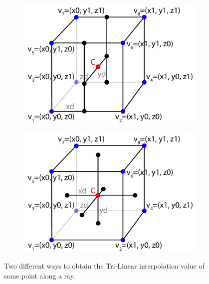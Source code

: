 \begin{figure}[h!]
    \centering
    \captionsetup{justification=centering,margin=0.5cm}
    \begin{subfigure}[t]{0.48\textwidth}
        \includegraphics[width=\textwidth]{img/tri_lin_interpolation1.pdf}
        \caption{ }
        \label{fig:trilinear0a}
    \end{subfigure}
    \begin{subfigure}[t]{0.48\textwidth}
        \includegraphics[width=\textwidth]{img/tri_lin_interpolation2.pdf}
        \caption{ }
        \label{fig:trilinear0b}
    \end{subfigure}
    \caption{Two different ways to obtain the Tri-Linear interpolation value of some point along a ray.}
    \label{fig:trilinear0}
\end{figure}

